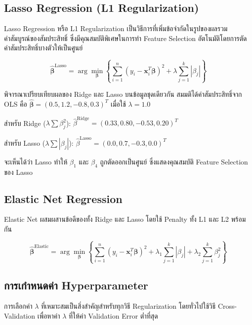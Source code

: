 \subsection{Lasso Regression (L1 Regularization)}
Lasso Regression หรือ L1 Regularization เป็นวิธีการที่เพิ่มข้อจำกัดในรูปของผลรวมค่าสัมบูรณ์ของสัมประสิทธิ์ ซึ่งมีคุณสมบัติพิเศษในการทำ Feature Selection อัตโนมัติโดยการตัดค่าสัมประสิทธิ์บางตัวให้เป็นศูนย์

\[
\hat{\boldsymbol{\beta}}^{\text{Lasso}} = \arg\min_{\boldsymbol{\beta}} \left\{ \sum_{i=1}^{n}(y_i - \mathbf{x}_i^T\boldsymbol{\beta})^2 + \lambda \sum_{j=1}^{k}|\beta_j| \right\}
\]

\begin{exmp}
\label{exmp:lasso_regression_example}
พิจารณาเปรียบเทียบผลของ Ridge และ Lasso บนข้อมูลชุดเดียวกัน สมมติได้ค่าสัมประสิทธิ์จาก OLS คือ $\hat{\boldsymbol{\beta}} = (0.5, 1.2, -0.8, 0.3)^T$ เมื่อใช้ $\lambda = 1.0$

สำหรับ Ridge ($\lambda \sum\beta_j^2$): $\hat{\beta}^{\text{Ridge}} = (0.33, 0.80, -0.53, 0.20)^T$

สำหรับ Lasso ($\lambda \sum|\beta_j|$): $\hat{\beta}^{\text{Lasso}} = (0.0, 0.7, -0.3, 0.0)^T$

จะเห็นได้ว่า Lasso ทำให้ $\beta_1$ และ $\beta_4$ ถูกตัดออกเป็นศูนย์ ซึ่งแสดงคุณสมบัติ Feature Selection ของ Lasso
\end{exmp}

\subsection{Elastic Net Regression}
Elastic Net ผสมผสานข้อดีของทั้ง Ridge และ Lasso โดยใช้ Penalty ทั้ง L1 และ L2 พร้อมกัน

\[
\hat{\boldsymbol{\beta}}^{\text{Elastic}} = \arg\min_{\boldsymbol{\beta}} \left\{ \sum_{i=1}^{n}(y_i - \mathbf{x}_i^T\boldsymbol{\beta})^2 + \lambda_1 \sum_{j=1}^{k}|\beta_j| + \lambda_2 \sum_{j=1}^{k}\beta_j^2 \right\}
\]

\subsection{การเกำหนดค่า Hyperparameter}
การเลือกค่า $\lambda$ ที่เหมาะสมเป็นสิ่งสำคัญสำหรับทุกวิธี Regularization โดยทั่วไปใช้วิธี Cross-Validation เพื่อหาค่า $\lambda$ ที่ให้ค่า Validation Error ต่ำที่สุด


